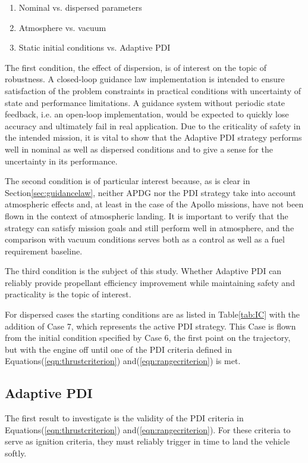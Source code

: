 \begin{enumerate}
	\item Nominal vs. dispersed parameters
	\item Atmosphere vs. vacuum
	\item Static initial conditions vs. Adaptive PDI
\end{enumerate}

The first condition, the effect of dispersion, is of interest on the topic of robustness. A closed-loop guidance law implementation is intended to ensure satisfaction of the problem constraints in practical conditions with uncertainty of state and performance limitations. A guidance system without periodic state feedback, i.e. an open-loop implementation, would be expected to quickly lose accuracy and ultimately fail in real application. Due to the criticality of safety in the intended mission, it is vital to show that the Adaptive PDI strategy performs well in nominal as well as dispersed conditions and to give a sense for the uncertainty in its performance.

The second condition is of particular interest because, as is clear in Section\:\ref{sec:guidancelaw}, neither APDG nor the PDI strategy take into account atmospheric effects and, at least in the case of the Apollo missions, have not been flown in the context of atmospheric landing. It is important to verify that the strategy can satisfy mission goals and still perform well in atmosphere, and the comparison with vacuum conditions serves both as a control as well as a fuel requirement baseline. 

The third condition is the subject of this study. Whether Adaptive PDI can reliably provide propellant efficiency improvement while maintaining safety and practicality is the topic of interest.

For dispersed cases the starting conditions are as listed in Table\:\ref{tab:IC} with the addition of Case 7, which represents the active PDI strategy. This Case is flown from the initial condition specified by Case 6, the first point on the trajectory, but with the engine off until one of the PDI criteria defined in Equations\:(\ref{eqn:thrustcriterion}) and\:(\ref{eqn:rangecriterion}) is met.

\subsection{Adaptive PDI} \label{sec:PDIres}
The first result to investigate is the validity of the PDI criteria in Equations\:(\ref{eqn:thrustcriterion}) and\:(\ref{eqn:rangecriterion}). For these criteria to serve as ignition criteria, they must reliably trigger in time to land the vehicle softly.

